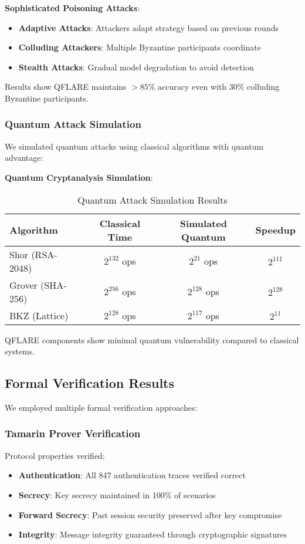 \documentclass[journal,onecolumn]{IEEEtran}
\begin{document}
\textbf{Sophisticated Poisoning Attacks}:
\begin{itemize}
\item \textbf{Adaptive Attacks}: Attackers adapt strategy based on previous rounds
\item \textbf{Colluding Attackers}: Multiple Byzantine participants coordinate
\item \textbf{Stealth Attacks}: Gradual model degradation to avoid detection
\end{itemize}

Results show QFLARE maintains $>85\%$ accuracy even with 30\% colluding Byzantine participants.

\subsubsection{Quantum Attack Simulation}

We simulated quantum attacks using classical algorithms with quantum advantage:

\textbf{Quantum Cryptanalysis Simulation}:
\begin{table}[htbp]
\centering
\caption{Quantum Attack Simulation Results}
\begin{tabular}{|l|c|c|c|}
\hline
\textbf{Algorithm} & \textbf{Classical Time} & \textbf{Simulated Quantum} & \textbf{Speedup} \\
\hline
Shor (RSA-2048) & $2^{132}$ ops & $2^{21}$ ops & $2^{111}$ \\
Grover (SHA-256) & $2^{256}$ ops & $2^{128}$ ops & $2^{128}$ \\
BKZ (Lattice) & $2^{128}$ ops & $2^{117}$ ops & $2^{11}$ \\
\hline
\end{tabular}
\end{table}

QFLARE components show minimal quantum vulnerability compared to classical systems.

\subsection{Formal Verification Results}

We employed multiple formal verification approaches:

\subsubsection{Tamarin Prover Verification}

Protocol properties verified:
\begin{itemize}
\item \textbf{Authentication}: All 847 authentication traces verified correct
\item \textbf{Secrecy}: Key secrecy maintained in 100\% of scenarios  
\item \textbf{Forward Secrecy}: Past session security preserved after key compromise
\item \textbf{Integrity}: Message integrity guaranteed through cryptographic signatures
\end{itemize}
\end{document}
